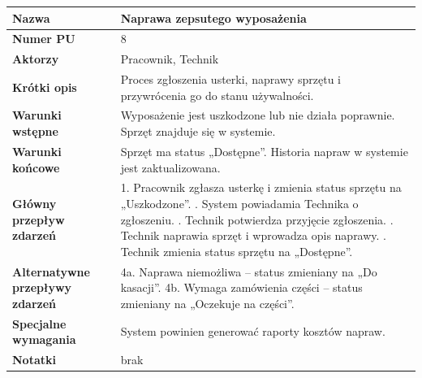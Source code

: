 \documentclass{article}
\begin{document}
    \begin{tabular}{|m{10em}|m{30em}|}
        \hline
        \textbf{Nazwa} & Naprawa zepsutego wyposażenia \\
        \hline
        \textbf{Numer PU} & 8 \\
        \hline
        \textbf{Aktorzy} & Pracownik, Technik \\
        \hline
        \textbf{Krótki opis} & Proces zgłoszenia usterki, naprawy sprzętu i przywrócenia go do stanu używalności. \\
        \hline
        \textbf{Warunki wstępne} & Wyposażenie jest uszkodzone lub nie działa poprawnie. Sprzęt znajduje się w systemie. \\
        \hline
        \textbf{Warunki końcowe} & Sprzęt ma status „Dostępne”. Historia napraw w systemie jest zaktualizowana. \\
        \hline
        \textbf{Główny przepływ zdarzeń} & 
            1. Pracownik zgłasza usterkę i zmienia status sprzętu na „Uszkodzone”. \newline
            2. System powiadamia Technika o zgłoszeniu. \newline
            3. Technik potwierdza przyjęcie zgłoszenia. \newline
            4. Technik naprawia sprzęt i wprowadza opis naprawy. \newline
            5. Technik zmienia status sprzętu na „Dostępne”. \\
        \hline
        \textbf{Alternatywne przepływy zdarzeń} & 
            4a. Naprawa niemożliwa – status zmieniany na „Do kasacji”. \newline
            4b. Wymaga zamówienia części – status zmieniany na „Oczekuje na części”. \\
        \hline
        \textbf{Specjalne wymagania} & System powinien generować raporty kosztów napraw. \\
        \hline
        \textbf{Notatki} & brak \\
        \hline
    \end{tabular}

\vspace{1cm}
\end{document}
